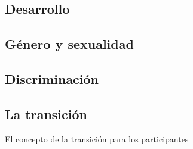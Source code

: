 \subsection{Desarrollo}
%
%
%
\subsection{Género y sexualidad}
%
%
%
\subsection{Discriminación}
%
%
%
%
\subsection{La transición}

El concepto de la transición para los participantes

%
%
%
